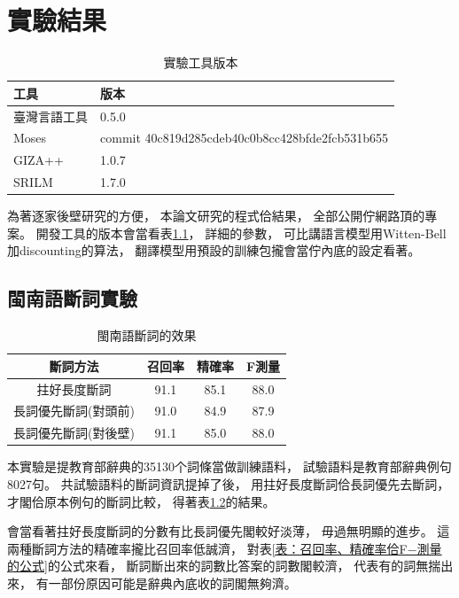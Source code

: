 \chapter{實驗結果}
\label{章：實驗結果}

\begin{table}
\caption{實驗工具版本}
\label{表：實驗工具版本}
\centering
\begin{tabular}{l|l}
工具 & 版本\\
\hline
臺灣言語工具\cite{臺灣言語工具} & 0.5.0\\
Moses\cite{Koehn:2007:MOS:1557769.1557821} & commit 40c819d285cdeb40c0b8cc428bfde2fcb531b655\\
GIZA++\cite{och2003systematic} & 1.0.7\\
SRILM\cite{stolcke2002srilm} & 1.7.0\\
\end{tabular}
\end{table}

為著逐家後壁研究的方便，
本論文研究的程式佮結果，
全部公開佇網路頂的專案\cite{翻譯研究}。
開發工具的版本會當看表\ref{表：實驗工具版本}，
詳細的參數，
可比講語言模型用Witten-Bell加discounting的算法，
翻譯模型用預設的訓練包攏會當佇內底的設定看著。
\section{閩南語斷詞實驗}
\label{節：閩南語斷詞實驗}

\begin{table}
\caption{閩南語斷詞的效果}
\label{表：閩南語斷詞的效果}
\centering
\begin{tabular}{c|ccc}
斷詞方法 & 召回率 & 精確率 & F測量\\
\hline
拄好長度斷詞 & 91.1 & 85.1 & 88.0\\
長詞優先斷詞(對頭前) & 91.0 & 84.9 & 87.9\\
長詞優先斷詞(對後壁) & 91.1 & 85.0 & 88.0\\
\end{tabular}
\end{table}

本實驗是提教育部辭典的35130个詞條當做訓練語料，
試驗語料是教育部辭典例句8027句。
共試驗語料的斷詞資訊提掉了後，
用拄好長度斷詞佮長詞優先去斷詞，
才閣佮原本例句的斷詞比較，
得著表\ref{表：閩南語斷詞的效果}的結果。

會當看著拄好長度斷詞的分數有比長詞優先閣較好淡薄，
毋過無明顯的進步。
這兩種斷詞方法的精確率攏比召回率低誠濟，
對表\ref{表：召回率、精確率佮F−測量的公式}的公式來看，
斷詞斷出來的詞數比答案的詞數閣較濟，
代表有的詞無揣出來，
有一部份原因可能是辭典內底收的詞閣無夠濟。

